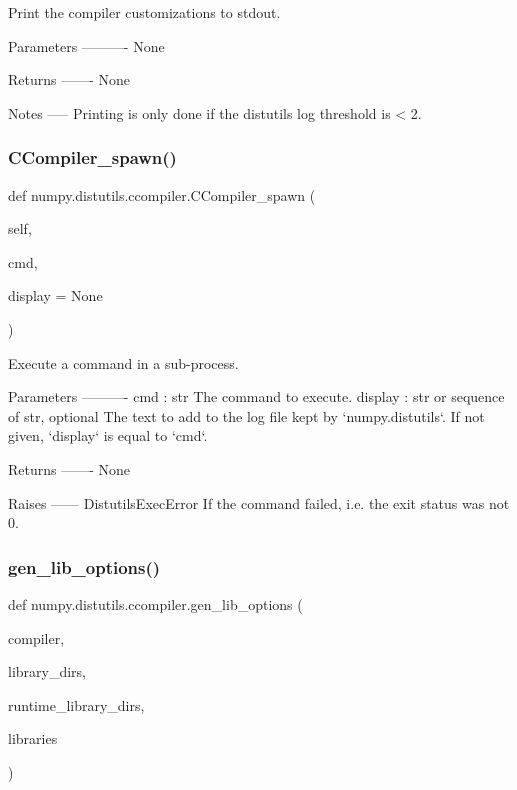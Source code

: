 \begin{DoxyVerb}Print the compiler customizations to stdout.

Parameters
----------
None

Returns
-------
None

Notes
-----
Printing is only done if the distutils log threshold is < 2.\end{DoxyVerb}
 \mbox{\label{namespacenumpy_1_1distutils_1_1ccompiler_aa07416f7e654ea7e8d5da1592fe4c988}} 
\subsubsection{\texorpdfstring{C\+Compiler\+\_\+spawn()}{CCompiler\_spawn()}}
{\footnotesize\ttfamily def numpy.\+distutils.\+ccompiler.\+C\+Compiler\+\_\+spawn (\begin{DoxyParamCaption}\item[{}]{self,  }\item[{}]{cmd,  }\item[{}]{display = {\ttfamily None} }\end{DoxyParamCaption})}

\begin{DoxyVerb}Execute a command in a sub-process.

Parameters
----------
cmd : str
    The command to execute.
display : str or sequence of str, optional
    The text to add to the log file kept by `numpy.distutils`.
    If not given, `display` is equal to `cmd`.

Returns
-------
None

Raises
------
DistutilsExecError
    If the command failed, i.e. the exit status was not 0.\end{DoxyVerb}
 \mbox{\label{namespacenumpy_1_1distutils_1_1ccompiler_a68159259c38dbd2f04a6c53f2c73113a}} 
\subsubsection{\texorpdfstring{gen\+\_\+lib\+\_\+options()}{gen\_lib\_options()}}
{\footnotesize\ttfamily def numpy.\+distutils.\+ccompiler.\+gen\+\_\+lib\+\_\+options (\begin{DoxyParamCaption}\item[{}]{compiler,  }\item[{}]{library\+\_\+dirs,  }\item[{}]{runtime\+\_\+library\+\_\+dirs,  }\item[{}]{libraries }\end{DoxyParamCaption})}

